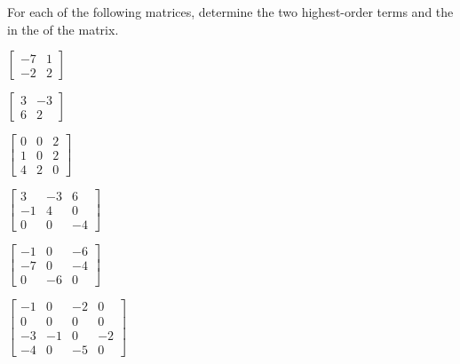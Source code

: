 \begin{exercise}  
For each of the following matrices, determine the two highest-order terms and the  in the  of the matrix.
\begin{Parts}
\item \(\begin{bmatrix} -7 & 1
\\-2 & 2 \end{bmatrix}\)

\item \(\begin{bmatrix} 3 & -3
\\6 & 2 \end{bmatrix}\)

\item \(\begin{bmatrix} 0 & 0 & 2
\\1 & 0 & 2
\\4 & 2 & 0 \end{bmatrix}\)

\item \(\begin{bmatrix} 3 & -3 & 6
\\-1 & 4 & 0
\\0 & 0 & -4 \end{bmatrix}\)

\begin{OmitV1}
\item \(\begin{bmatrix} -1 & 0 & -6
\\-7 & 0 & -4
\\0 & -6 & 0 \end{bmatrix}\)

\item \(\begin{bmatrix} -1 & 0 & -2 & 0
\\0 & 0 & 0 & 0
\\-3 & -1 & 0 & -2
\\-4 & 0 & -5 & 0 \end{bmatrix}\)
\end{OmitV1}


\end{Parts}
\end{exercise}
